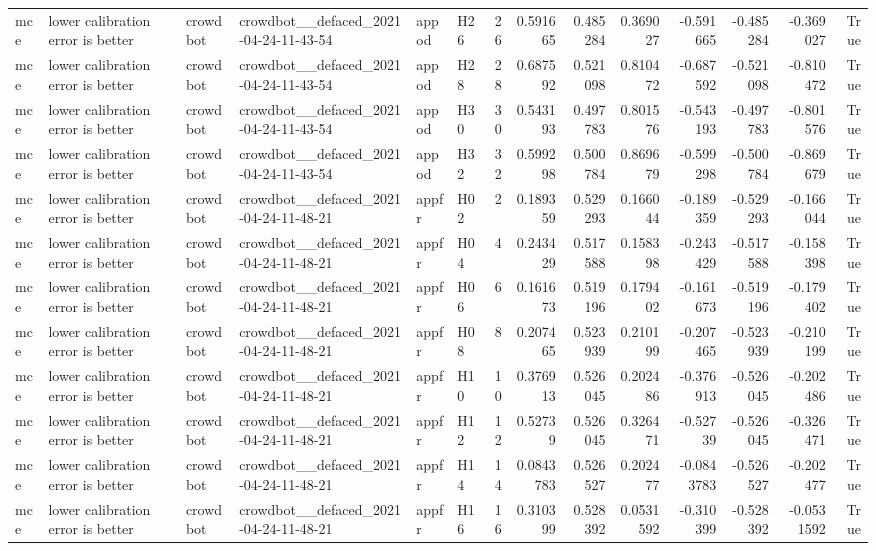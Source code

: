 \begin{longtable}{llllllrrrrrrrr}
mce & lower calibration error is better & crowdbot & crowdbot\_\_defaced\_2021-04-24-11-43-54 & appod & H26 & 26 & 0.591665 & 0.485284 & 0.369027 & -0.591665 & -0.485284 & -0.369027 & True \\
mce & lower calibration error is better & crowdbot & crowdbot\_\_defaced\_2021-04-24-11-43-54 & appod & H28 & 28 & 0.687592 & 0.521098 & 0.810472 & -0.687592 & -0.521098 & -0.810472 & True \\
mce & lower calibration error is better & crowdbot & crowdbot\_\_defaced\_2021-04-24-11-43-54 & appod & H30 & 30 & 0.543193 & 0.497783 & 0.801576 & -0.543193 & -0.497783 & -0.801576 & True \\
mce & lower calibration error is better & crowdbot & crowdbot\_\_defaced\_2021-04-24-11-43-54 & appod & H32 & 32 & 0.599298 & 0.500784 & 0.869679 & -0.599298 & -0.500784 & -0.869679 & True \\
mce & lower calibration error is better & crowdbot & crowdbot\_\_defaced\_2021-04-24-11-48-21 & appfr & H02 & 2 & 0.189359 & 0.529293 & 0.166044 & -0.189359 & -0.529293 & -0.166044 & True \\
mce & lower calibration error is better & crowdbot & crowdbot\_\_defaced\_2021-04-24-11-48-21 & appfr & H04 & 4 & 0.243429 & 0.517588 & 0.158398 & -0.243429 & -0.517588 & -0.158398 & True \\
mce & lower calibration error is better & crowdbot & crowdbot\_\_defaced\_2021-04-24-11-48-21 & appfr & H06 & 6 & 0.161673 & 0.519196 & 0.179402 & -0.161673 & -0.519196 & -0.179402 & True \\
mce & lower calibration error is better & crowdbot & crowdbot\_\_defaced\_2021-04-24-11-48-21 & appfr & H08 & 8 & 0.207465 & 0.523939 & 0.210199 & -0.207465 & -0.523939 & -0.210199 & True \\
mce & lower calibration error is better & crowdbot & crowdbot\_\_defaced\_2021-04-24-11-48-21 & appfr & H10 & 10 & 0.376913 & 0.526045 & 0.202486 & -0.376913 & -0.526045 & -0.202486 & True \\
mce & lower calibration error is better & crowdbot & crowdbot\_\_defaced\_2021-04-24-11-48-21 & appfr & H12 & 12 & 0.52739 & 0.526045 & 0.326471 & -0.52739 & -0.526045 & -0.326471 & True \\
mce & lower calibration error is better & crowdbot & crowdbot\_\_defaced\_2021-04-24-11-48-21 & appfr & H14 & 14 & 0.0843783 & 0.526527 & 0.202477 & -0.0843783 & -0.526527 & -0.202477 & True \\
mce & lower calibration error is better & crowdbot & crowdbot\_\_defaced\_2021-04-24-11-48-21 & appfr & H16 & 16 & 0.310399 & 0.528392 & 0.0531592 & -0.310399 & -0.528392 & -0.0531592 & True \\

\end{longtable}
